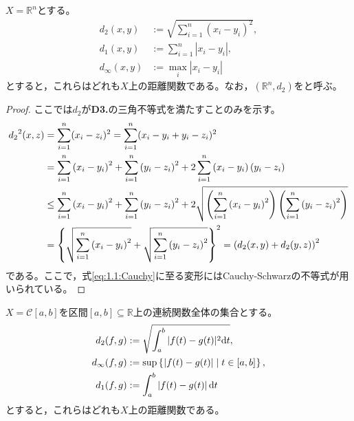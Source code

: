 \documentclass[uplatex]{jsarticle}
\begin{document}
\begin{rei}
    $X = \mathbb{R}^{n}$とする。
    \begin{align}
        d_{2} (x,y) &:= \sqrt{\sum_{i=1}^{n} (x_{i} - y_{i})^{2}}, \\
        d_{1} (x,y) &:= \sum_{i=1}^{n} |x_{i} - y_{i}|, \\
        d_{\infty} (x,y) &:= \max_{i} |x_{i} - y_{i}|
    \end{align}
    とすると，これらはどれも$X$上の距離関数である。なお，$(\mathbb{R}^{n}, d_{2})$をと呼ぶ。
\end{rei}
\begin{proof}
    ここでは$d_{2}$が{\bf D3.}の三角不等式を満たすことのみを示す。
    \begin{align}
        {d_{2}}^{2}(x,z)
        &= \sum_{i=1}^{n} (x_{i} - z_{i})^{2} = \sum_{i=1}^{n} (x_{i} - y_{i} + y_{i} - z_{i})^{2} \notag \\
        &= \sum_{i=1}^{n} \left( x_{i} - y_{i} \right)^{2} + \sum_{i=1}^{n} \left( y_{i} - z_{i} \right)^{2} + 2 \sum_{i=1}^{n} \left( x_{i} - y_{i} \right) \left( y_{i} - z_{i} \right) \notag \\
      &\le \sum_{i=1}^{n} \left( x_{i} - y_{i} \right)^{2} + \sum_{i=1}^{n} \left( y_{i} - z_{i} \right)^{2} + 2 \sqrt{\left( \sum_{i=1}^{n} \left( x_{i} - y_{i} \right)^{2} \right) \left( \sum_{i=1}^{n} \left( y_{i} - z_{i} \right)^{2} \right)} \label{eq:1.1:Cauchy}\\
        &= \left\{ \sqrt{\sum_{i=1}^{n} \left( x_{i} - y_{i} \right)^{2}} + \sqrt{\sum_{i=1}^{n} \left( y_{i} - z_{i} \right)^{2}} \right\}^{2}
         = \left( d_{2}(x,y) + d_{2} (y,z) \right)^{2}
    \end{align}
    である。ここで，式\eqref{eq:1.1:Cauchy}に至る変形にはCauchy-Schwarzの不等式が用いられている。
\end{proof}

\begin{rei}
    $X = \mathcal{C} [a,b]$を区間$[a,b] \subseteq \mathbb{R}$上の連続関数全体の集合とする。
    \begin{align}
        d_{2} (f,g) &:= \sqrt{ \int_{a}^{b} | f(t) - g(t) | ^{2} \mathrm{d}t}, \\
        d_{\infty} (f,g) &:= \sup \Set{\hspace{-1.8pt}  \left| f(t) - g(t) \right| | t \in [a,b] \hspace{-1.8pt}}, \\
        d_{1} (f,g) &:= \int_{a}^{b} \left| f(t) - g(t) \right| \mathrm{d}t
    \end{align}
    とすると，これらはどれも$X$上の距離関数である。
\end{rei}
\end{document}
